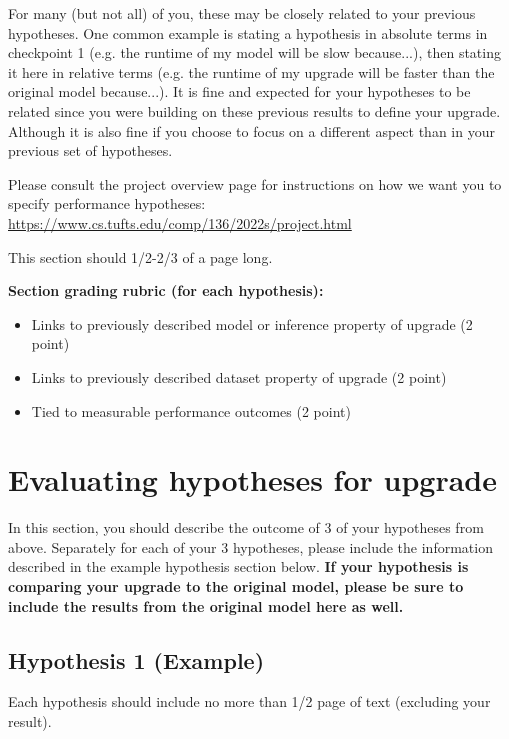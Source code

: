 \documentclass[12pt]{article}
\begin{document}
For many (but not all) of you, these may be closely related to your previous hypotheses.  One common example is stating a hypothesis in absolute terms in checkpoint 1 (e.g. the runtime of my model will be slow because...), then stating it here in relative terms (e.g. the runtime of my upgrade will be faster than the original model because...).  It is fine and expected for your hypotheses to be related since you were building on these previous results to define your upgrade.  Although it is also fine if you choose to focus on a different aspect than in your previous set of hypotheses.

Please consult the project overview page for instructions on how we want you to specify performance hypotheses: \url{https://www.cs.tufts.edu/comp/136/2022s/project.html}

This section should 1/2-2/3 of a page long.

\textbf{Section grading rubric (for each hypothesis):}
\begin{itemize}
	\item Links to previously described model or inference property of upgrade (2 point)
	\item Links to previously described dataset property of upgrade (2 point)
	\item Tied to measurable performance outcomes (2 point)
\end{itemize}

\section{Evaluating hypotheses for upgrade}

In this section, you should describe the outcome of 3 of your hypotheses from above.  Separately for each of your 3 hypotheses, please include the information described in the example hypothesis section below.  \textbf{If your hypothesis is comparing your upgrade to the original model, please be sure to include the results from the original model here as well.} 

\subsection{Hypothesis 1 (Example)}

Each hypothesis should include no more than 1/2 page of text (excluding your result).  
\end{document}
